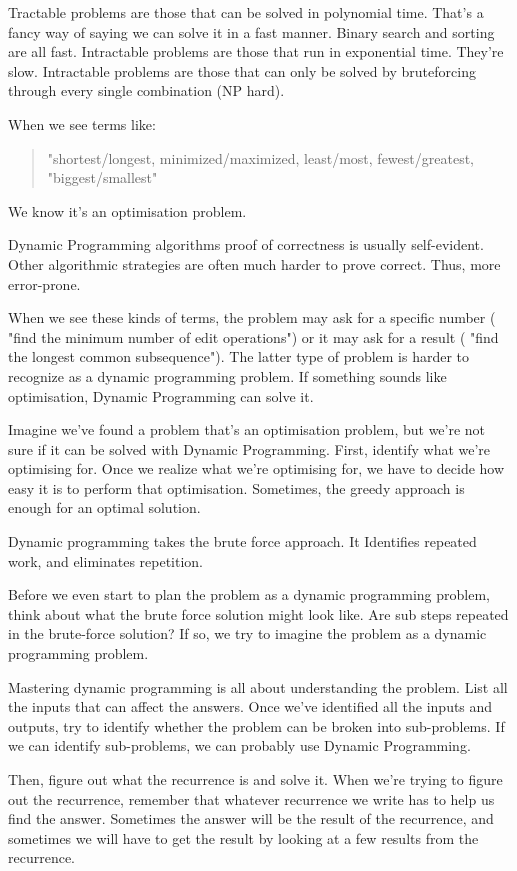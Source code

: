 \documentclass{article}
\begin{document}
Tractable problems are those that can be solved in polynomial time. That's a fancy way of saying we can solve it in a fast manner. Binary search and sorting are all fast. Intractable problems are those that run in exponential time. They're slow. Intractable problems are those that can only be solved by bruteforcing through every single combination (NP hard).

When we see terms like:
\begin{quote}
    "shortest/longest, minimized/maximized, least/most, fewest/greatest, "biggest/smallest" 
\end{quote}
We know it's an optimisation problem.

Dynamic Programming algorithms proof of correctness is usually self-evident. Other algorithmic strategies are often much harder to prove correct. Thus, more error-prone.

When we see these kinds of terms, the problem may ask for a specific number ( "find the minimum number of edit operations") or it may ask for a result ( "find the longest common subsequence"). The latter type of problem is harder to recognize as a dynamic programming problem. If something sounds like optimisation, Dynamic Programming can solve it.

Imagine we've found a problem that's an optimisation problem, but we're not sure if it can be solved with Dynamic Programming. First, identify what we're optimising for. Once we realize what we're optimising for, we have to decide how easy it is to perform that optimisation. Sometimes, the greedy approach is enough for an optimal solution. 

Dynamic programming takes the brute force approach. It Identifies repeated work, and eliminates repetition. 

Before we even start to plan the problem as a dynamic programming problem, think about what the brute force solution might look like. Are sub steps repeated in the brute-force solution?  If so, we try to imagine the problem as a dynamic programming problem.

Mastering dynamic programming is all about understanding the problem. List all the inputs that can affect the answers. Once we've identified all the inputs and outputs, try to identify whether the problem can be broken into sub-problems. If we can identify sub-problems, we can probably use Dynamic Programming. 

Then, figure out what the recurrence is and solve it. When we're trying to figure out the recurrence, remember that whatever recurrence we write has to help us find the answer. Sometimes the answer will be the result of the recurrence, and sometimes we will have to get the result by looking at a few results from the recurrence.
\end{document}
